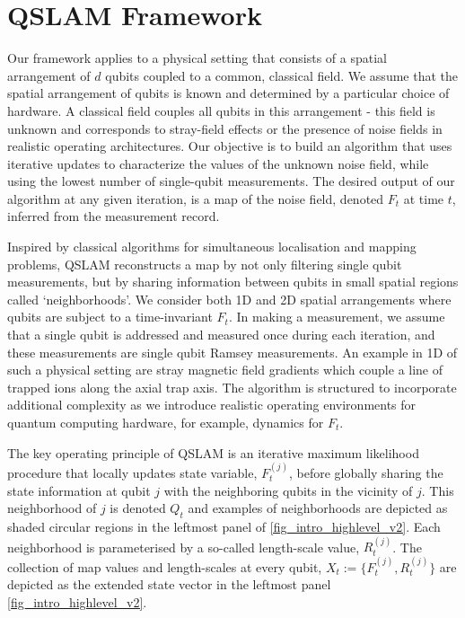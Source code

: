 \section{QSLAM Framework}
Our framework applies to a physical setting that consists of a spatial arrangement of $d$ qubits coupled to a common, classical field. We assume that the spatial arrangement of qubits is known and determined by a particular choice of hardware. A classical field couples all qubits in this arrangement - this field is unknown and corresponds to stray-field effects or the presence of noise fields in realistic operating architectures.  Our objective is to build an algorithm that uses iterative updates to characterize the values of the unknown noise field, while using the lowest number of single-qubit measurements. The desired output of our algorithm at any given iteration, is a map of the noise field, denoted $F_t$ at time $t$, inferred from the measurement record. 

Inspired by classical algorithms for simultaneous localisation and mapping problems, QSLAM reconstructs a map by not only filtering single qubit measurements, but by sharing information between qubits in small spatial regions called `neighborhoods'. We consider both 1D and 2D spatial arrangements where qubits are subject to a time-invariant $F_t$. In making a measurement, we assume that a single qubit is addressed and measured once during each iteration, and these measurements are single qubit Ramsey measurements. An example in 1D of such a physical setting are stray magnetic field gradients which couple a line of trapped ions along the axial trap axis. The algorithm is structured to incorporate additional complexity as we introduce realistic operating environments for quantum computing hardware, for example, dynamics for $F_t$.

The key operating principle of QSLAM is an iterative maximum likelihood procedure that locally updates state variable, $F_t^{(j)}$, before globally sharing the state information at qubit $j$ with the neighboring qubits in the vicinity of $j$. This neighborhood of $j$ is  denoted $Q_t$ and examples of neighborhoods are depicted as shaded circular regions in the leftmost panel of \cref{fig_intro_highlevel_v2}. Each neighborhood is parameterised by a so-called length-scale value, $R_t^{(j)}$.   The collection of map values and length-scales at every qubit, $X_t:=\{F_t^{(j)}, R_t^{(j)}\}$ are depicted as the extended state vector in the leftmost panel \cref{fig_intro_highlevel_v2}. 

